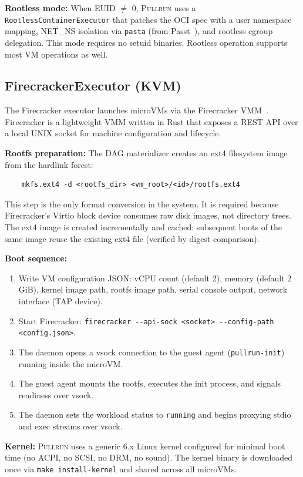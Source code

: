 \documentclass[11pt,a4paper]{article}
\newcommand{\pullrun}{\textsc{Pullrun}}
\begin{document}
\textbf{Rootless mode:} When EUID $\neq$ 0, \pullrun{} uses a \texttt{RootlessContainerExecutor} that patches the OCI spec with a user namespace mapping, NET\_NS isolation via \texttt{pasta} (from Passt~\cite{passt}), and rootless cgroup delegation. This mode requires no setuid binaries. Rootless operation supports most VM operations as well.

\subsection{FirecrackerExecutor (KVM)}

The Firecracker executor launches microVMs via the Firecracker VMM~\cite{firecracker}. Firecracker is a lightweight VMM written in Rust that exposes a REST API over a local UNIX socket for machine configuration and lifecycle.

\textbf{Rootfs preparation:} The DAG materializer creates an ext4 filesystem image from the hardlink forest:
\begin{verbatim}
    mkfs.ext4 -d <rootfs_dir> <vm_root>/<id>/rootfs.ext4
\end{verbatim}
This step is the only format conversion in the system. It is required because Firecracker's Virtio block device consumes raw disk images, not directory trees. The ext4 image is created incrementally and cached: subsequent boots of the same image reuse the existing ext4 file (verified by digest comparison).

\textbf{Boot sequence:}
\begin{enumerate}[leftmargin=*]
    \item Write VM configuration JSON: vCPU count (default 2), memory (default 2 GiB), kernel image path, rootfs image path, serial console output, network interface (TAP device).
    \item Start Firecracker: \texttt{firecracker -{}-api-sock <socket> -{}-config-path <config.json>}.
    \item The daemon opens a vsock connection to the guest agent (\texttt{pullrun-init}) running inside the microVM.
    \item The guest agent mounts the rootfs, executes the init process, and signals readiness over vsock.
    \item The daemon sets the workload status to \texttt{running} and begins proxying stdio and exec streams over vsock.
\end{enumerate}

\textbf{Kernel:} \pullrun{} uses a generic 6.x Linux kernel configured for minimal boot time (no ACPI, no SCSI, no DRM, no sound). The kernel binary is downloaded once via \texttt{make install-kernel} and shared across all microVMs.
\end{document}

